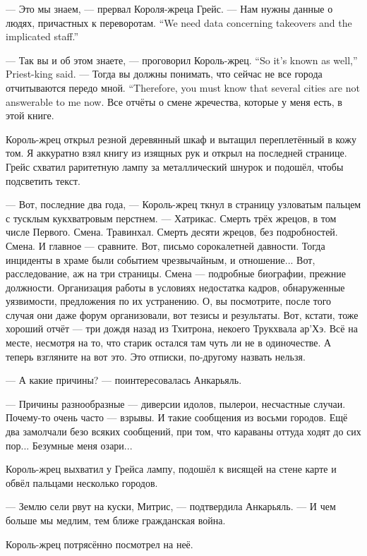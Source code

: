 --- Это мы знаем, --- прервал Короля-жреца Грейс.
{--- Нам нужны данные о людях, причастных к переворотам.}
{``We need data concerning takeovers and the implicated staff.''}

{--- Так вы и об этом знаете, --- проговорил Король-жрец.}
{``So it's known as well,'' Priest-king said.}
{--- Тогда вы должны понимать, что сейчас не все города отчитываются передо мной.}
{``Therefore, you must know that several cities are not answerable to me now.}
Все отчёты о смене жречества, которые у меня есть, в этой книге.

Король-жрец открыл резной деревянный шкаф и вытащил переплетённый в кожу том.
Я аккуратно взял книгу из изящных рук и открыл на последней странице.
Грейс схватил раритетную лампу за металлический шнурок и подошёл, чтобы подсветить текст.

--- Вот, последние два года, --- Король-жрец ткнул в страницу узловатым пальцем с тусклым кукхватровым перстнем.
--- Хатрикас.
Смерть трёх жрецов, в том числе Первого.
Смена.
Травинхал.
Смерть десяти жрецов, без подробностей.
Смена.
И главное --- сравните.
Вот, письмо сорокалетней давности.
Тогда инциденты в храме были событием чрезвычайным, и отношение...
Вот, расследование, аж на три страницы.
Смена --- подробные биографии, прежние должности.
Организация работы в условиях недостатка кадров, обнаруженные уязвимости, предложения по их устранению.
О, вы посмотрите, после того случая они даже форум организовали, вот тезисы и результаты.
Вот, кстати, тоже хороший отчёт --- три дождя назад из Тхитрона, некоего Трукхвала ар'Хэ.
Всё на месте, несмотря на то, что старик остался там чуть ли не в одиночестве.
А теперь взгляните на вот это.
Это отписки, по-другому назвать нельзя.

--- А какие причины? --- поинтересовалась Анкарьяль.

--- Причины разнообразные --- диверсии идолов, пылерои, несчастные случаи.
Почему-то очень часто --- взрывы.
И такие сообщения из восьми городов.
Ещё два замолчали безо всяких сообщений, при том, что караваны оттуда ходят до сих пор...
Безумные меня озари...

Король-жрец выхватил у Грейса лампу, подошёл к висящей на стене карте и обвёл пальцами несколько городов.

--- Землю сели рвут на куски, Митрис, --- подтвердила Анкарьяль.
--- И чем больше мы медлим, тем ближе гражданская война.

Король-жрец потрясённо посмотрел на неё.


